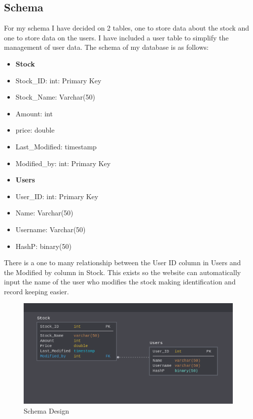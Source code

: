 \documentclass[10pt,a4paper]{report}
\begin{document}
	\subsection{Schema}
	For my schema I have decided on 2 tables, one to store data about the stock and one to store data on the users. I have included a user table to simplify the management of user data. The schema of my database is as follows:
	 	\begin{itemize}
	 		\item \textbf{Stock}
	 		\item Stock\_ID: int: Primary Key
	 		\item Stock\_Name: Varchar(50)
	 		\item Amount: int
	 		\item price: double
	 		\item Last\_Modified: timestamp
	 		\item Modified\_by: int: Primary Key
	 		\\
	 		\item \textbf{Users}
	 		\item User\_ID: int: Primary Key
	 		\item Name: Varchar(50)
	 		\item Username: Varchar(50)
	 		\item HashP: binary(50)
	 	\end{itemize}
 	There is a one to many relationship between the User ID column in Users and the Modified by column in Stock. This exists so the website can automatically input the name of the user who modifies the stock making identification and record keeping easier.\\
	\begin{figure}[h]
		\hspace*{-1.6in}
		\centering
		\includegraphics[scale=1]{schema.png}
		\caption{Schema Design}
	\end{figure}
	
\end{document}
